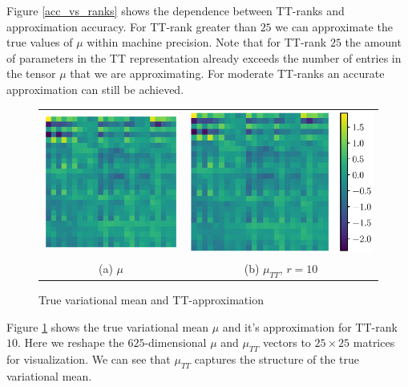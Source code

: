 Figure \ref{acc_vs_ranks} shows the dependence between TT-ranks and 
approximation accuracy. For TT-rank greater than $25$ we can approximate the
true values of $\mu$ within machine precision. Note that for TT-rank $25$ the
amount of parameters in the TT representation already exceeds the number of
entries in the tensor $\mu$ that we are approximating. For moderate
TT-ranks an accurate approximation can still be achieved.

\begin{figure}[!h]
  \begin{center}
      \begin{tabular}{cc}
          \includegraphics[trim = 100 0 60 0, clip, height=0.4\linewidth]{pics/true.eps} &
        \hspace{0.5cm}\includegraphics[trim = 100 0 0 0, clip, height=0.4\linewidth]{pics/tt.eps} \\
          (a) $\mu$ &
          (b) $\mu_{TT}$, $r = 10$
      \end{tabular}
  \end{center}
  \caption{True variational mean and TT-approximation}
  \label{true_and_tt}
\end{figure}

Figure \ref{true_and_tt} shows the true variational mean $\mu$ and it's 
approximation for TT-rank $10$. Here we reshape the $625$-dimensional 
$\mu$ and $\mu_{TT}$ vectors
to $25 \times 25$ matrices for visualization. We can see that $\mu_{TT}$ captures the 
structure of the true variational mean.

